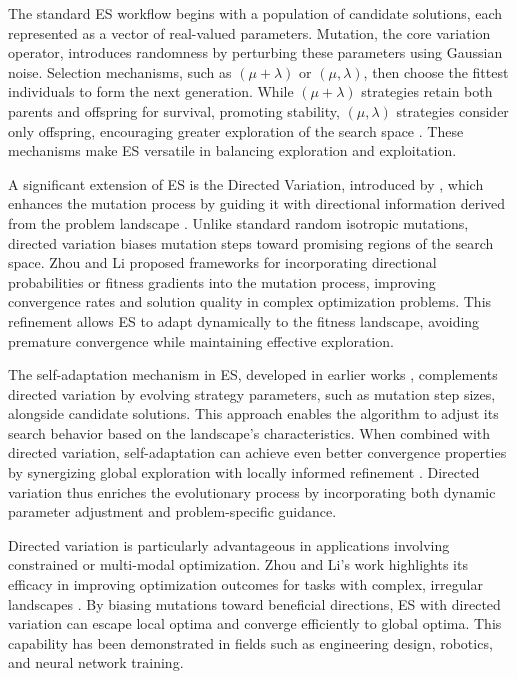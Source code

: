 The standard ES workflow begins with a population of candidate solutions, each represented as a vector of real-valued parameters. Mutation, the core variation operator, introduces randomness by perturbing these parameters using Gaussian noise. Selection mechanisms, such as \((\mu+\lambda)\) or \((\mu,\lambda)\), then choose the fittest individuals to form the next generation. While $(\mu+\lambda)$ strategies retain both parents and offspring for survival, promoting stability, \((\mu,\lambda)\) strategies consider only offspring, encouraging greater exploration of the search space \parencite{schwefel1993evolution}. These mechanisms make ES versatile in balancing exploration and exploitation.

A significant extension of ES is the Directed Variation, introduced by \textcite{zhou2003directed}, which enhances the mutation process by guiding it with directional information derived from the problem landscape \parencite{zhou2003directed}. Unlike standard random isotropic mutations, directed variation biases mutation steps toward promising regions of the search space. Zhou and Li proposed frameworks for incorporating directional probabilities or fitness gradients into the mutation process, improving convergence rates and solution quality in complex optimization problems. This refinement allows ES to adapt dynamically to the fitness landscape, avoiding premature convergence while maintaining effective exploration.

The self-adaptation mechanism in ES, developed in earlier works \parencite{schwefel1981numerical}, complements directed variation by evolving strategy parameters, such as mutation step sizes, alongside candidate solutions. This approach enables the algorithm to adjust its search behavior based on the landscape's characteristics. When combined with directed variation, self-adaptation can achieve even better convergence properties by synergizing global exploration with locally informed refinement \parencite{beyer2001theory}. Directed variation thus enriches the evolutionary process by incorporating both dynamic parameter adjustment and problem-specific guidance.

Directed variation is particularly advantageous in applications involving constrained or multi-modal optimization. Zhou and Li's work highlights its efficacy in improving optimization outcomes for tasks with complex, irregular landscapes \parencite{zhou2003directed}. By biasing mutations toward beneficial directions, ES with directed variation can escape local optima and converge efficiently to global optima. This capability has been demonstrated in fields such as engineering design, robotics, and neural network training.

